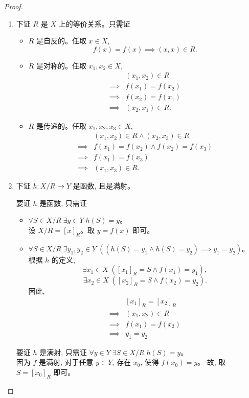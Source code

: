 \begin{proof}
  \begin{enumerate}[(1)]
    \item 下证 $R$ 是 $X$ 上的等价关系。只需证
      \begin{itemize}
        \item $R$ 是自反的。任取 $x \in X$,
          \[
            f(x) = f(x) \implies (x, x) \in R.
          \]
        \item $R$ 是对称的。任取 $x_{1}, x_{2} \in X$,
          \begin{align*}
            & (x_{1}, x_{2}) \in R \\
            \implies & f(x_{1}) = f(x_{2}) \\
            \implies & f(x_{2}) = f(x_{1}) \\
            \implies & (x_{2}, x_{1}) \in R.
          \end{align*}
        \item $R$ 是传递的。任取 $x_{1}, x_{2}, x_{3} \in X$,
          \begin{align*}
            & (x_{1}, x_{2}) \in R \land (x_{2}, x_{3}) \in R \\
            \implies & f(x_{1}) = f(x_{2}) \land f(x_{2}) = f(x_{3}) \\
            \implies & f(x_{1}) = f(x_{3}) \\
            \implies & (x_{1}, x_{3}) \in R.
          \end{align*}
      \end{itemize}
    \item 下证 $h: X/R \to Y$ 是函数, 且是满射。

		  要证 $h$ 是函数, 只需证
      \begin{itemize}
        \item $\forall S \in X/R\; \exists y \in Y\; h(S) = y$。\\
          设 $X/R = [x]_{R}$。取 $y = f(x)$ 即可。
        \item $\forall S \in X/R\; \exists y_{1}, y_{2} \in Y\;
          ((h(S) = y_{1} \land h(S) = y_{2}) \implies y_{1} = y_{2})$。\\
          根据 $h$ 的定义,
          \[
            \exists x_{1} \in X\; ([x_{1}]_{R} = S \land f(x_{1}) = y_{1}),
          \]
          \[
            \exists x_{2} \in X\; ([x_{2}]_{R} = S \land f(x_{2}) = y_{2}).
          \]
          因此,
          \begin{align*}
            & [x_{1}]_{R} = [x_{2}]_{R} \\
            \implies & (x_{1}, x_{2}) \in R \\
            \implies & f(x_{1}) = f(x_{2}) \\
            \implies & y_{1} = y_{2}
          \end{align*}
      \end{itemize}
      要证 $h$ 是满射, 只需证 $\forall y \in Y\; \exists S \in X/R\; h(S) = y$。\\
      因为 $f$ 是满射, 对于任意 $y \in Y$, 存在 $x_{0}$, 使得 $f(x_{0}) = y$。
      故, 取 $S = [x_{0}]_{R}$ 即可。
  \end{enumerate}
\end{proof}

